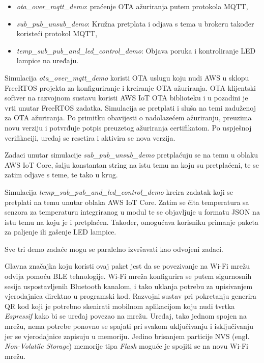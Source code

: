 \begin{itemize}
	\item \textit{ota\_over\_mqtt\_demo}: praćenje OTA ažuriranja putem protokola MQTT,
	\item \textit{sub\_pub\_unsub\_demo}: Kružna pretplata i odjava s tema u brokeru također koristeći protokol MQTT,
	\item \textit{temp\_sub\_pub\_and\_led\_control\_demo}: Objava poruka i kontroliranje LED lampice na uređaju.
\end{itemize}

Simulacija \textit{ota\_over\_mqtt\_demo} koristi OTA uslugu koju nudi AWS u sklopu FreeRTOS projekta za konfiguriranje i kreiranje OTA ažuriranja. OTA klijentski softver na razvojnom sustavu koristi AWS IoT OTA biblioteku i u pozadini je vrti unutar FreeRTOS zadatka. Simulacija se pretplati i sluša na temi zaduženoj za OTA ažuriranja. Po primitku obavijesti o nadolazećem ažuriranju, preuzima novu verziju i potvrđuje potpis preuzetog ažuriranja certifikatom. Po uspješnoj verifikaciji, uređaj se resetira i aktivira se nova verzija.  

Zadaci unutar simulacije \textit{sub\_pub\_unsub\_demo} pretplaćuju se na temu u oblaku AWS IoT Core, šalju konstantan string na istu temu na koju su pretplaćeni, te se zatim odjave s teme, te tako u krug.

Simulacija \textit{temp\_sub\_pub\_and\_led\_control\_demo} kreira zadatak koji se pretplati na temu unutar oblaka AWS IoT Core. Zatim se čita temperatura sa senzora za temperaturu integriranog u modul te se objavljuje u formatu JSON na istu temu na koju je i pretplaćen. Također, omogućava korisniku primanje paketa za paljenje ili gašenje LED lampice. 

Sve tri demo zadaće mogu se paralelno izvršavati kao odvojeni zadaci.

Glavna značajka koju koristi ovaj paket jest da se povezivanje na Wi-Fi mrežu odvija pomoću BLE tehnologije. Wi-Fi mreža konfigurira se putem sigurnosnih sesija uspostavljenih Bluetooth kanalom, i tako uklanja potrebu za upisivanjem vjerodajnica direktno u programski kod. Razvojni sustav pri pokretanju generira QR kod koji je potrebno skenirati mobilnom aplikacijom koju nudi tvrtka \textit{Espressif} \cite{esp_ble_provisioning} kako bi se uređaj povezao na mrežu. Uređaj, tako jednom spojen na mrežu, nema potrebe ponovno se spajati pri svakom uključivanju i isključivanju jer se vjerodajnice zapisuju u memoriju. Jedino brisanjem particije NVS (engl. \textit{Non-Volatile Storage}) memorije tipa \textit{Flash} moguće je spojiti se na novu Wi-Fi mrežu. 


